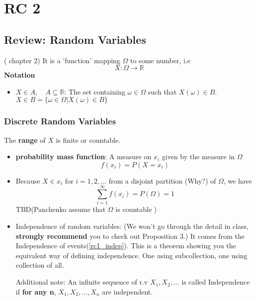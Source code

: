 \chapter{RC 2}

\section{Review: Random Variables}
(\cite{Und_Chatterjee} chapter 2) 
It is a 'function' mapping $\Omega$ to some number, i.e
\[
    X : \Omega \to \mathbb{R}
\]
\textbf{Notation}  
\begin{itemize}
    \item \(X \in A,\quad A \subseteq \mathbb{R}\): The set containing  \(\omega \in \Omega \) such that \(X(\omega ) \in B\). \(X \in B  = \{\omega  \in \Omega | X(\omega ) \in B \}\) 
\end{itemize}
\subsection{Discrete Random Variables}
The \textbf{range} of \(X\) is finite or countable. 
\begin{itemize}
    \item \textbf{probability mass function}: A measure on \(x_i\) given by the measure in \(\Omega \)
    \[
        f(x_i) = P(X = x_i)
    \] 
    \item Because \(X \in x_i\) for \(i = 1,2,\dots\) from a disjoint partition (Why?) of \(\Omega \), we have 
    \[
        \sum_{i=1}^{\infty} f(x_i) = P(\Omega ) = 1
    \]
    TBD(Panchenko assume that \(\Omega \) is countable )    
    \item Independence of random variables: 
    (We won't go through the detail in class, \textbf{strongly recommend} you to check out \cite{Und_Chatterjee} Proposition 3.) 
    It comes from the Independence of events(\ref{rc1_indep}). This is a theorem showing you the equivalent way of defining independence. 
    One using subcollection, one using collection of all. 
    
    Additional note: An infinite sequence of r.v \(X_1, X_2 , \dots\) is called Independence if \textbf{for any n}, \(X_1, X_2, \dots, X_n\) are independent.   
\end{itemize}
